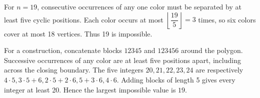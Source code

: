 For $n=19$, consecutive occurrences of any one color must be separated by at least five cyclic positions. Each color occurs at most $\left\lfloor\dfrac{19}{5}\right\rfloor=3$ times, so six colors cover at most 18 vertices. Thus 19 is impossible.

For a construction, concatenate blocks $12345$ and $123456$ around the polygon. Successive occurrences of any color are at least five positions apart, including across the closing boundary. The five integers $20,21,22,23,24$ are respectively $4\cdot5,3\cdot5+6,2\cdot5+2\cdot6,5+3\cdot6,4\cdot6$. Adding blocks of length 5 gives every integer at least 20. Hence the largest impossible value is $\boxed{19}$.
